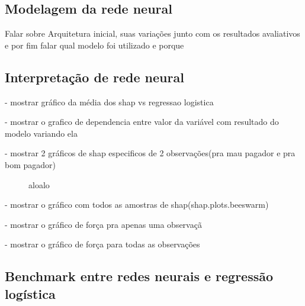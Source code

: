 

\subsection*{Modelagem da rede neural}
Falar sobre Arquitetura inicial, suas variações junto com os 
resultados avaliativos e por fim falar qual modelo foi utilizado
e porque

\subsection*{Interpretação de rede neural}

- mostrar gráfico da média dos shap vs regressao logistica

- mostrar o grafico de dependencia entre valor da variável com resultado do modelo variando ela

- mostrar 2 gráficos de shap especificos de 2 observações(pra mau pagador e pra bom pagador)
\begin{figure}[H]
  \centering
  \vspace{.5cm}
  \vspace{.5cm}
  
  \label{fig:enter-label}
  \caption{aloalo}
\end{figure}

- mostrar o gráfico com todos as amostras de shap(shap.plots.beeswarm)


- mostrar o gráfico de força pra apenas uma observaçã

- mostrar o gráfico de força para todas as observações

\subsection*{Benchmark entre redes neurais e regressão logística}


